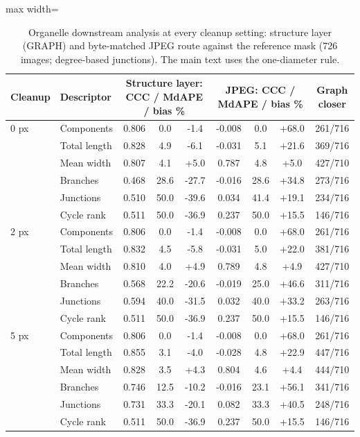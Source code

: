 \begin{table}[h]
\centering
\caption{Organelle downstream analysis at every cleanup setting: structure layer (GRAPH) and byte-matched JPEG route against the reference mask (726 images; degree-based junctions). The main text uses the one-diameter rule.}
\label{tab:supp-ds-L}
\footnotesize
\begin{adjustbox}{max width=\linewidth}
\begin{tabular}{llccccccc}
\toprule
Cleanup & Descriptor & \multicolumn{3}{c}{Structure layer: CCC / MdAPE / bias \%} & \multicolumn{3}{c}{JPEG: CCC / MdAPE / bias \%} & Graph closer\\
\midrule
0 px & Components & 0.806 & 0.0 & -1.4 & -0.008 & 0.0 & +68.0 & 261/716\\
 & Total length & 0.828 & 4.9 & -6.1 & -0.031 & 5.1 & +21.6 & 369/716\\
 & Mean width & 0.807 & 4.1 & +5.0 & 0.787 & 4.8 & +5.0 & 427/710\\
 & Branches & 0.468 & 28.6 & -27.7 & -0.016 & 28.6 & +34.8 & 273/716\\
 & Junctions & 0.510 & 50.0 & -39.6 & 0.034 & 41.4 & +19.1 & 234/716\\
 & Cycle rank & 0.511 & 50.0 & -36.9 & 0.237 & 50.0 & +15.5 & 146/716\\
\midrule
2 px & Components & 0.806 & 0.0 & -1.4 & -0.008 & 0.0 & +68.0 & 261/716\\
 & Total length & 0.832 & 4.5 & -5.8 & -0.031 & 5.0 & +22.0 & 381/716\\
 & Mean width & 0.810 & 4.0 & +4.9 & 0.789 & 4.8 & +4.9 & 427/710\\
 & Branches & 0.568 & 22.2 & -20.6 & -0.019 & 25.0 & +46.6 & 311/716\\
 & Junctions & 0.594 & 40.0 & -31.5 & 0.032 & 40.0 & +33.2 & 263/716\\
 & Cycle rank & 0.511 & 50.0 & -36.9 & 0.237 & 50.0 & +15.5 & 146/716\\
\midrule
5 px & Components & 0.806 & 0.0 & -1.4 & -0.008 & 0.0 & +68.0 & 261/716\\
 & Total length & 0.855 & 3.1 & -4.0 & -0.028 & 4.8 & +22.9 & 447/716\\
 & Mean width & 0.828 & 3.5 & +4.3 & 0.804 & 4.6 & +4.4 & 444/710\\
 & Branches & 0.746 & 12.5 & -10.2 & -0.016 & 23.1 & +56.1 & 341/716\\
 & Junctions & 0.731 & 33.3 & -20.1 & 0.082 & 33.3 & +40.5 & 248/716\\
 & Cycle rank & 0.511 & 50.0 & -36.9 & 0.237 & 50.0 & +15.5 & 146/716\\

\end{tabular}
\end{adjustbox}
\end{table}
